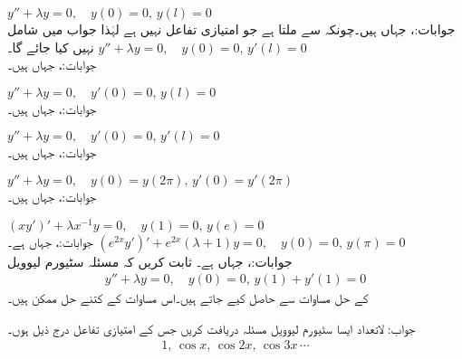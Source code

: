 \quad
$y''+\lambda y=0, \quad y(0)=0,\,y(l)=0$\\
جوابات:،  جہاں  ہیں۔چونکہ  سے  ملتا ہے جو امتیازی تفاعل نہیں ہے لہٰذا  جواب میں شامل نہیں کیا جائے گا۔
\quad
$y''+\lambda y=0, \quad y(0)=0,\,y'(l)=0$\\
جوابات:،  جہاں  ہیں۔

\quad
$y''+\lambda y=0, \quad y'(0)=0,\,y(l)=0$\\
جوابات:،  جہاں  ہیں۔

\quad
$y''+\lambda y=0, \quad y'(0)=0,\,y'(l)=0$\\
جوابات:،  جہاں  ہیں۔

\quad
$y''+\lambda y=0, \quad y(0)=y(2\pi),\,y'(0)=y'(2\pi)$\\
جوابات:،  جہاں  ہیں۔

\quad
$(xy')'+\lambda x^{-1}y=0,\quad y(1)=0,\, y(e)=0$\\
جوابات:،  جہاں  ہے۔
\quad
$(e^{2x}y')'+e^{2x}(\lambda+1)y=0,\quad y(0)=0,\, y(\pi)=0$\\
جوابات:،  جہاں  ہے۔
ثابت کریں کہ مسئلہ سٹیورم لیوویل
\begin{align*}
y''+\lambda y=0, \quad y(0)=0,\, y(1)+y'(1)=0
\end{align*} 
کے حل مساوات  سے حاصل کیے جاتے ہیں۔اس مساوات کے کتنے حل ممکن ہیں۔

جواب: لاتعداد
ایسا سٹیورم لیوویل مسئلہ دریافت کریں جس کے امتیازی تفاعل درج ذیل ہوں۔
\begin{align*}
1,\, \cos x,\, \cos 2x,\, \cos 3x\, \cdots
\end{align*}

